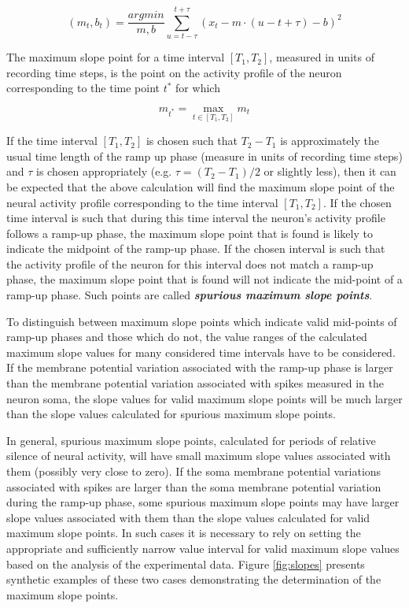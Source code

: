 \begin{equation}
\label{eq:local_slope}
(m_{t},b_{t})=\frac{argmin}{m,b}\sum^{t+\tau}_{u=t-\tau}(x_{t}-m\cdot(u-t+\tau)-b)^2
\end{equation}

The maximum slope point for a time interval $[T_{1},T_{2}]$, measured in units of recording time steps, is the point on the activity profile of the neuron corresponding to the time point $t^{*}$ for which 

\begin{equation}
m_{t^{*}}=\max_{t\in[T_{1},T_{2}]}m_{t}
\end{equation}

If the time interval $[T_{1},T_{2}]$ is chosen such that $T_{2}-T_{1}$ is approximately the usual time length of the ramp up phase (measure in units of recording time steps) and $\tau$ is chosen appropriately (e.g. $\tau=(T_{2}-T_{1})/2$ or slightly less), then it can be expected that the above calculation will find the maximum slope point of the neural activity profile corresponding to the time interval $[T_{1},T_{2}]$. If the chosen time interval is such that during this time interval the neuron's activity profile follows a ramp-up phase, the maximum slope point that is found is likely to indicate the midpoint of the ramp-up phase. If the chosen interval is such that the activity profile of the neuron for this interval does not match a ramp-up phase, the maximum slope point that is found will not indicate the mid-point of a ramp-up phase. Such points are called \textbf{\textit{spurious maximum slope points}}.

To distinguish between maximum slope points which indicate valid mid-points of ramp-up phases and those which do not, the value ranges of the calculated maximum slope values for many considered time intervals have to be considered. If the membrane potential variation associated with the ramp-up phase is larger than the membrane potential variation associated with spikes measured in the neuron soma, the slope values for valid maximum slope points will be much larger than the slope values calculated for spurious maximum slope points.

In general, spurious maximum slope points, calculated for periods of relative silence of neural activity, will have small maximum slope values associated with them (possibly very close to zero). If the soma membrane potential variations associated with spikes are larger than the soma membrane potential variation during the ramp-up phase, some spurious maximum slope points may have larger slope values associated with them than the slope values calculated for valid maximum slope points. In such cases it is necessary to rely on setting the appropriate and sufficiently narrow value interval for valid maximum slope values based on the analysis of the experimental data. Figure \ref{fig:slopes} presents synthetic examples of these two cases demonstrating the determination of the maximum slope points.

